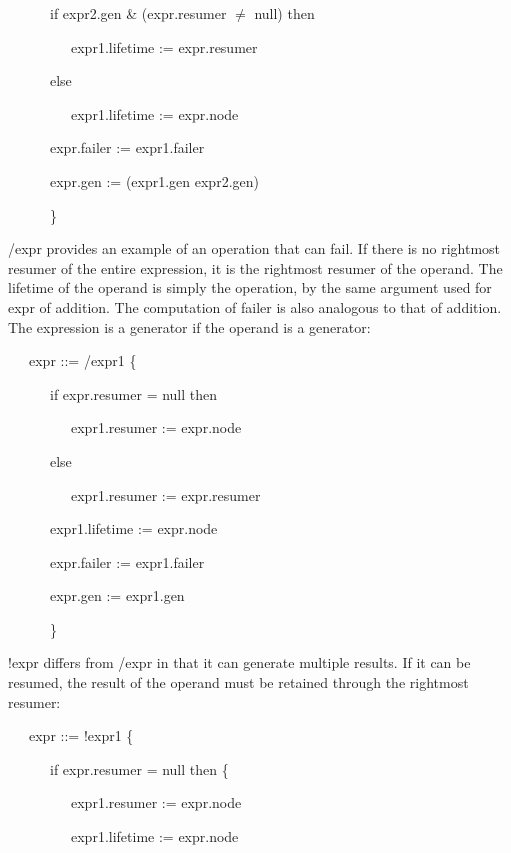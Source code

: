 {\ttfamily\mdseries
\ \ \ \ \ \ if expr2.gen \& (expr.resumer ${\neq}$ null) then}

{\ttfamily\mdseries
\ \ \ \ \ \ \ \ \ expr1.lifetime := expr.resumer}

{\ttfamily\mdseries
\ \ \ \ \ \ else}

{\ttfamily\mdseries
\ \ \ \ \ \ \ \ \ expr1.lifetime := expr.node}

{\ttfamily\mdseries
\ \ \ \ \ \ expr.failer := expr1.failer}

{\ttfamily\mdseries
\ \ \ \ \ \ expr.gen := (expr1.gen {\textbar} expr2.gen)}

{\ttfamily\mdseries
\ \ \ \ \ \ \}}


/expr provides an example of an operation that can fail. If there is
no rightmost resumer of the entire expression, it is the rightmost
resumer of the operand. The lifetime of the operand is simply the
operation, by the same argument used for expr of
addition. The computation of failer is also analogous to that of
addition. The expression is a generator if the operand is a generator:

{\ttfamily\mdseries
\ \ \ expr ::= /expr1 \{}

{\ttfamily\mdseries
\ \ \ \ \ \ if expr.resumer = null then}

{\ttfamily\mdseries
\ \ \ \ \ \ \ \ \ expr1.resumer := expr.node}

{\ttfamily\mdseries
\ \ \ \ \ \ else}

{\ttfamily\mdseries
\ \ \ \ \ \ \ \ \ expr1.resumer := expr.resumer}

{\ttfamily\mdseries
\ \ \ \ \ \ expr1.lifetime := expr.node}

{\ttfamily\mdseries
\ \ \ \ \ \ expr.failer := expr1.failer}

{\ttfamily\mdseries
\ \ \ \ \ \ expr.gen := expr1.gen}

{\ttfamily\mdseries
\ \ \ \ \ \ \}}


!expr differs from /expr in that it can generate multiple results. If
it can be resumed, the result of the operand must be retained through
the rightmost resumer:

{\ttfamily\mdseries
\ \ \ expr ::= !expr1 \{}

{\ttfamily\mdseries
\ \ \ \ \ \ if expr.resumer = null then \{}

{\ttfamily\mdseries
\ \ \ \ \ \ \ \ \ expr1.resumer := expr.node}

{\ttfamily\mdseries
\ \ \ \ \ \ \ \ \ expr1.lifetime := expr.node}

